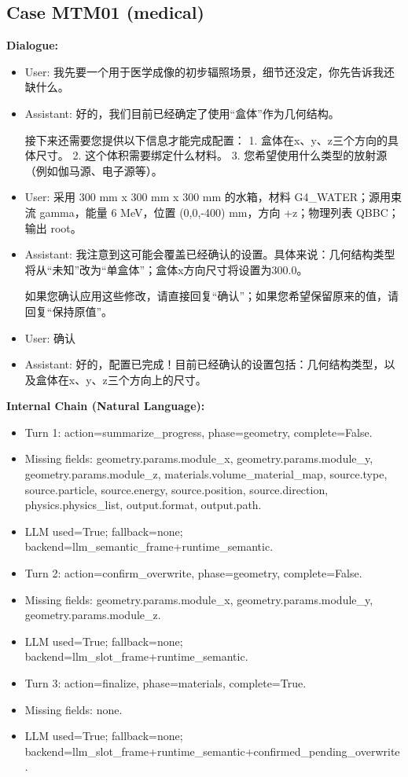 \documentclass[11pt]{ctexart}
\begin{document}
\subsection{Case MTM01 (medical)}
\textbf{Dialogue:}
\begin{itemize}
\item User: 我先要一个用于医学成像的初步辐照场景，细节还没定，你先告诉我还缺什么。
\item Assistant: 好的，我们目前已经确定了使用“盒体”作为几何结构。

接下来还需要您提供以下信息才能完成配置：
1.  盒体在x、y、z三个方向的具体尺寸。
2.  这个体积需要绑定什么材料。
3.  您希望使用什么类型的放射源（例如伽马源、电子源等）。
\item User: 采用 300 mm x 300 mm x 300 mm 的水箱，材料 G4\_WATER；源用束流 gamma，能量 6 MeV，位置 (0,0,-400) mm，方向 +z；物理列表 QBBC；输出 root。
\item Assistant: 我注意到这可能会覆盖已经确认的设置。具体来说：几何结构类型将从“未知”改为“单盒体”；盒体x方向尺寸将设置为300.0。

如果您确认应用这些修改，请直接回复“确认”；如果您希望保留原来的值，请回复“保持原值”。
\item User: 确认
\item Assistant: 好的，配置已完成！目前已经确认的设置包括：几何结构类型，以及盒体在x、y、z三个方向上的尺寸。
\end{itemize}
\textbf{Internal Chain (Natural Language):}
\begin{itemize}
\item Turn 1: action=summarize\_progress, phase=geometry, complete=False.
\item Missing fields: geometry.params.module\_x, geometry.params.module\_y, geometry.params.module\_z, materials.volume\_material\_map, source.type, source.particle, source.energy, source.position, source.direction, physics.physics\_list, output.format, output.path.
\item LLM used=True; fallback=none; backend=llm\_semantic\_frame+runtime\_semantic.
\item Turn 2: action=confirm\_overwrite, phase=geometry, complete=False.
\item Missing fields: geometry.params.module\_x, geometry.params.module\_y, geometry.params.module\_z.
\item LLM used=True; fallback=none; backend=llm\_slot\_frame+runtime\_semantic.
\item Turn 3: action=finalize, phase=materials, complete=True.
\item Missing fields: none.
\item LLM used=True; fallback=none; backend=llm\_slot\_frame+runtime\_semantic+confirmed\_pending\_overwrite.
\end{itemize}
\end{document}
